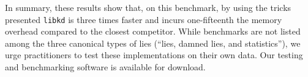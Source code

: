 
In summary, these results show that, on this benchmark, by using the
tricks presented {\tt libkd} is three times faster and incurs
one-fifteenth the memory overhead compared to the closest competitor.
While benchmarks are not listed among the three canonical types of
lies (``lies, damned lies, and statistics''), we urge practitioners to
test these implementations on their own data.  Our testing and
benchmarking software is available for download.








%
%
%





